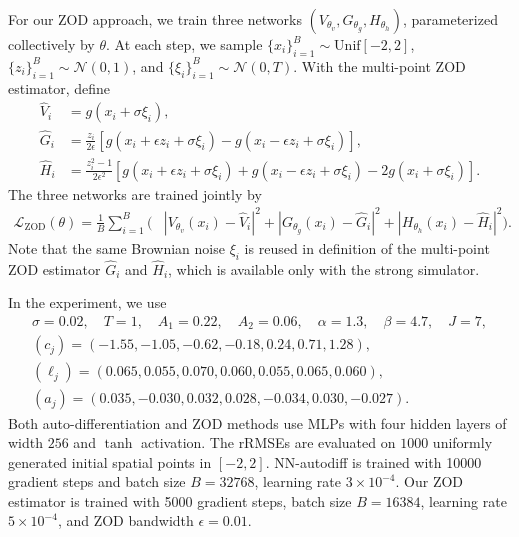 \documentclass[twoside,11pt]{article}
\newcommand{\1}{\mathbf{1}}
\numberwithin{equation}{section}
\begin{document}
For our ZOD approach, we train three networks
\((V_{\theta_v},G_{\theta_g},H_{\theta_h})\), parameterized  collectively by
\(\theta\). At each step, we sample \(\{x_i\}_{i=1}^B\sim\mathrm{Unif}[-2,2]\),
\(\{z_i\}_{i=1}^B\sim\mathcal N(0,1)\), and \(\{\xi_i\}_{i=1}^B\sim\mathcal N(0,T)\). With the
multi-point ZOD estimator, define
\begin{align}
    \widehat V_i
    &=
    g(x_i+\sigma\xi_i),\\
    \widehat G_i
    &=
    \frac{z_i}{2\epsilon}
    \left[
        g(x_i+\epsilon z_i+\sigma\xi_i)
        -
        g(x_i-\epsilon z_i+\sigma\xi_i)
    \right],\\
    \widehat H_i
    &=
    \frac{z_i^2-1}{2\epsilon^2}
    \left[
        g(x_i+\epsilon z_i+\sigma\xi_i)
        +
        g(x_i-\epsilon z_i+\sigma\xi_i)
        -
        2g(x_i+\sigma\xi_i)
    \right].
\end{align}
The three networks are trained jointly by
\begin{equation}
\begin{aligned}
    \mathcal L_{\mathrm{ZOD}}(\theta)
    =
    \frac1B\sum_{i=1}^{B}
    \Big(
    &|V_{\theta_v}(x_i)-\widehat V_i|^2
    +
    |G_{\theta_g}(x_i)-\widehat G_i|^2  +
    |H_{\theta_h}(x_i)-\widehat H_i|^2
    \Big).
\end{aligned}
\end{equation}
Note that the same Brownian noise \(\xi_i\) is reused in definition of the multi-point ZOD estimator
\(\widehat G_i\) and \(\widehat H_i\), which is available only with the strong simulator.

In the experiment, we use
\[
\begin{gathered}
\sigma=0.02,\quad T= 1,\quad
A_1=0.22,\quad A_2=0.06,\quad
\alpha=1.3,\quad \beta=4.7,\quad J=7,\\
(c_j)=(-1.55,-1.05,-0.62,-0.18,0.24,0.71,1.28),\\
(\ell_j)=(0.065,0.055,0.070,0.060,0.055,0.065,0.060),\\
(a_j)=(0.035,-0.030,0.032,0.028,-0.034,0.030,-0.027).
\end{gathered}
\]
Both auto-differentiation and ZOD methods use MLPs with four hidden layers of width \(256\) and \(\tanh\)
activation. The rRMSEs are evaluated on \(1000\) uniformly generated initial spatial
points in \([-2,2]\).  NN-autodiff is trained with 10000 gradient steps and  batch size \(B = 32768\), learning rate \(3\times10^{-4}\). Our  ZOD estimator is trained with 5000 gradient steps, batch size \(B = 16384\), learning rate \(5\times10^{-4}\), and ZOD bandwidth \(\epsilon=0.01\).
\end{document}

